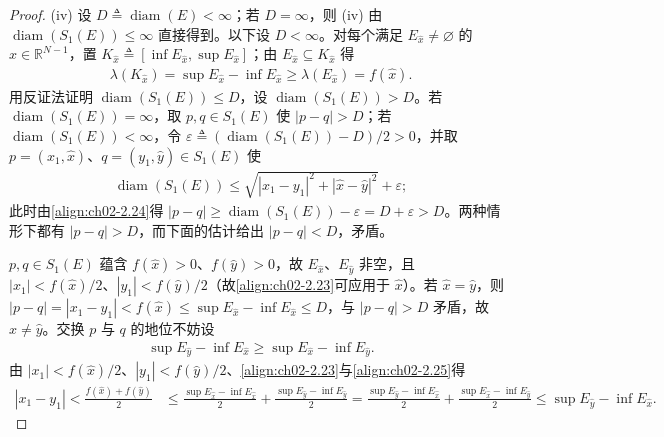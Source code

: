 \documentclass[../../main.tex]{subfiles}%
\begin{document}
\begin{proof}
(iv) 设 $D\triangleq\operatorname{diam}(E)<\infty$；若 $D=\infty$，则 (iv) 由 $\operatorname{diam}(S_1(E))\leqslant\infty$ 直接得到。以下设 $D<\infty$。对每个满足 $E_{\hat x}\neq\varnothing$ 的 $\hat x\in\mathbb R^{N-1}$，置 $K_{\hat x}\triangleq[\inf E_{\hat x},\sup E_{\hat x}]$；由 $E_{\hat x}\subseteq K_{\hat x}$ 得
\begin{align}
\lambda(K_{\hat x})=\sup E_{\hat x}-\inf E_{\hat x}\geqslant\lambda(E_{\hat x})=f(\hat x). \label{align:ch02-2.23}
\end{align}
用反证法证明 $\operatorname{diam}(S_1(E))\leqslant D$，设 $\operatorname{diam}(S_1(E))>D$。若 $\operatorname{diam}(S_1(E))=\infty$，取 $p,q\in S_1(E)$ 使 $|p-q|>D$；若 $\operatorname{diam}(S_1(E))<\infty$，令 $\varepsilon\triangleq(\operatorname{diam}(S_1(E))-D)/2>0$，并取 $p=(x_1,\hat x)$、$q=(y_1,\hat y)\in S_1(E)$ 使
\begin{align}
\operatorname{diam}(S_1(E))\leqslant\sqrt{|x_1-y_1|^2+|\hat x-\hat y|^2}+\varepsilon; \label{align:ch02-2.24}
\end{align}
此时由\eqref{align:ch02-2.24}得 $|p-q|\geqslant\operatorname{diam}(S_1(E))-\varepsilon=D+\varepsilon>D$。两种情形下都有 $|p-q|>D$，而下面的估计给出 $|p-q|<D$，矛盾。

$p,q\in S_1(E)$ 蕴含 $f(\hat x)>0$、$f(\hat y)>0$，故 $E_{\hat x}$、$E_{\hat y}$ 非空，且 $|x_1|<f(\hat x)/2$、$|y_1|<f(\hat y)/2$（故\eqref{align:ch02-2.23}可应用于 $\hat x$）。若 $\hat x=\hat y$，则 $|p-q|=|x_1-y_1|<f(\hat x)\leqslant\sup E_{\hat x}-\inf E_{\hat x}\leqslant D$，与 $|p-q|>D$ 矛盾，故 $\hat x\neq\hat y$。交换 $p$ 与 $q$ 的地位不妨设
\begin{align}
\sup E_{\hat y}-\inf E_{\hat x}\geqslant\sup E_{\hat x}-\inf E_{\hat y}. \label{align:ch02-2.25}
\end{align}
由 $|x_1|<f(\hat x)/2$、$|y_1|<f(\hat y)/2$、\eqref{align:ch02-2.23}与\eqref{align:ch02-2.25}得
\begin{align}
|x_1-y_1|<\frac{f(\hat x)+f(\hat y)}2
&\leqslant\frac{\sup E_{\hat x}-\inf E_{\hat x}}2+\frac{\sup E_{\hat y}-\inf E_{\hat y}}2
=\frac{\sup E_{\hat y}-\inf E_{\hat x}}2+\frac{\sup E_{\hat x}-\inf E_{\hat y}}2
\leqslant\sup E_{\hat y}-\inf E_{\hat x}. \label{align:ch02-2.26}
\end{align}


\end{proof}
\end{document}
